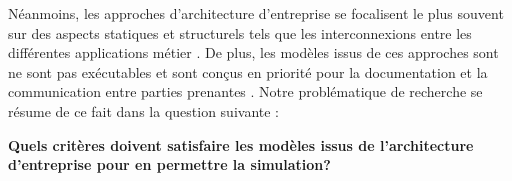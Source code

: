 Néanmoins, les approches d'architecture d'entreprise se focalisent le plus 
souvent sur 
des aspects statiques et structurels tels que les interconnexions entre les 
différentes applications métier \cite{buckl2008towards}. De plus, les modèles 
issus de ces approches sont ne sont pas exécutables et sont conçus en priorité 
pour la documentation et la communication entre parties prenantes 
\cite{kulkarni2013modelling}. Notre 
problématique de recherche se résume de ce fait dans la question suivante :

\textbf{Quels critères doivent satisfaire les modèles issus de l'architecture 
d'entreprise pour en permettre la simulation?}
     






